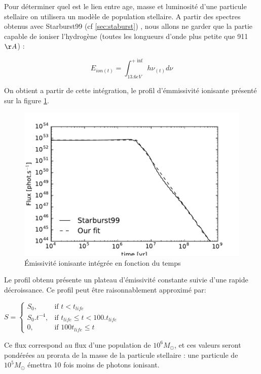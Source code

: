 Pour déterminer quel est le lien entre age, masse et luminosité d'une particule stellaire on utilisera un modèle de population stellaire.
A partir des spectres obtenus avec Starburst99 (cf \ref{sec:staburst}) , nous allons ne garder que la partie capable de ioniser l'hydrogène (toutes les longueurs d'onde plus petite que 911$\AA$) :

\begin{equation}
E_{ion (t)} = \int_{13.6eV}^{+\inf} h \nu_{(t)} d\nu
\end{equation}

On obtient a partir de cette intégration, le profil d'émmissivité ionisante présenté sur la figure \ref{fig:flux}.

\begin{figure}[htbp]
        \includegraphics[width=.95\linewidth]{img/03/flux.pdf} 
        \caption{Émissivité ionisante intégrée en fonction du temps}
 		\label{fig:flux}
\end{figure}

Le profil obtenu présente un plateau d'émissivité constante suivie d'une rapide décroissance.
Ce profil peut être raisonnablement approximé par:

$
    S = 
\begin{cases}
    S_0 ,         & \text{if } t < t_{life}\\
    S_0.t^{-4},   & \text{if } t_{life} \leq t < 100.t_{life} \\
    0,   & \text{if } 100t_{life} \leq t
\end{cases}
$

Ce flux correspond au flux d'une population de $10^6M_\odot$, et ces valeurs seront pondérées au prorata de la masse de la particule stellaire : une particule de $10^5M_\odot$ émettra 10 fois moins de photons ionisant.

